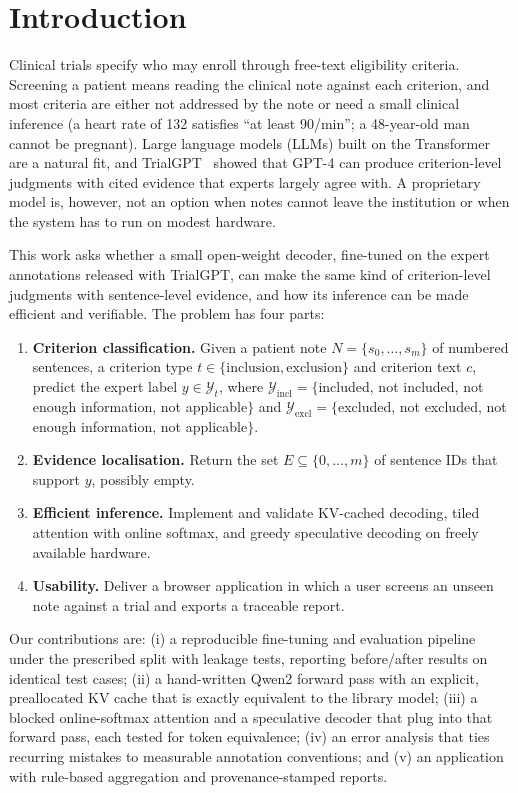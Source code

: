 \documentclass[conference]{IEEEtran}
\begin{document}
\section{Introduction}
Clinical trials specify who may enroll through free-text eligibility criteria. Screening a patient means reading the clinical note against each criterion, and most criteria are either not addressed by the note or need a small clinical inference (a heart rate of 132 satisfies ``at least 90/min''; a 48-year-old man cannot be pregnant). Large language models (LLMs) built on the Transformer~\cite{vaswani2017attention} are a natural fit, and TrialGPT~\cite{jin2024trialgpt} showed that GPT-4 can produce criterion-level judgments with cited evidence that experts largely agree with. A proprietary model is, however, not an option when notes cannot leave the institution or when the system has to run on modest hardware.

This work asks whether a small open-weight decoder, fine-tuned on the expert annotations released with TrialGPT, can make the same kind of criterion-level judgments with sentence-level evidence, and how its inference can be made efficient and verifiable. The problem has four parts:
\begin{enumerate}
\item \textbf{Criterion classification.} Given a patient note $N=\{s_0,\dots,s_m\}$ of numbered sentences, a criterion type $t\in\{\text{inclusion},\text{exclusion}\}$ and criterion text $c$, predict the expert label $y\in\mathcal{Y}_t$, where $\mathcal{Y}_{\text{incl}}=\{$included, not included, not enough information, not applicable$\}$ and $\mathcal{Y}_{\text{excl}}=\{$excluded, not excluded, not enough information, not applicable$\}$.
\item \textbf{Evidence localisation.} Return the set $E\subseteq\{0,\dots,m\}$ of sentence IDs that support $y$, possibly empty.
\item \textbf{Efficient inference.} Implement and validate KV-cached decoding, tiled attention with online softmax, and greedy speculative decoding on freely available hardware.
\item \textbf{Usability.} Deliver a browser application in which a user screens an unseen note against a trial and exports a traceable report.
\end{enumerate}

Our contributions are: (i) a reproducible fine-tuning and evaluation pipeline under the prescribed split with leakage tests, reporting before/after results on identical test cases; (ii) a hand-written Qwen2 forward pass with an explicit, preallocated KV cache that is exactly equivalent to the library model; (iii) a blocked online-softmax attention and a speculative decoder that plug into that forward pass, each tested for token equivalence; (iv) an error analysis that ties recurring mistakes to measurable annotation conventions; and (v) an application with rule-based aggregation and provenance-stamped reports.
\end{document}
